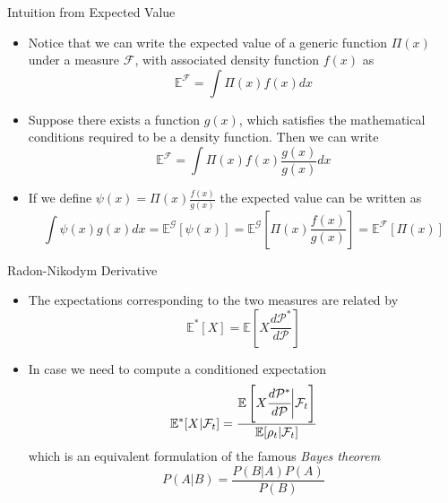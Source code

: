 \documentclass{beamer}
\begin{document}
\begin{frame}{Intuition from Expected Value}
	\begin{itemize}
		\item Notice that we can write the expected value of a generic function $\Pi(x)$ under a measure $\mathcal{F}$, with associated density function $f(x)$ as
		\begin{equation*}
			\mathbb{E}^{\mathcal{F}}=\int\Pi(x)f(x)dx
		\end{equation*}
		\item Suppose there exists a function $g(x)$, which satisfies the mathematical conditions required to be a density function. Then we can write
		\begin{equation*}
			\mathbb{E}^{\mathcal{F}}=\int\Pi(x)f(x)\frac{g(x)}{g(x)}dx
		\end{equation*}
		\item If we define $\psi(x)=\Pi(x)\frac{f(x)}{g(x)}$ the expected value can be written as 
		\begin{equation*}
			\int\psi(x)g(x)dx=\mathbb{E}^{\mathcal{G}}\left[\psi(x)\right]=\mathbb{E}^{\mathcal{G}}\left[\Pi(x)\frac{f(x)}{g(x)}\right]=\mathbb{E}^{\mathcal{F}}\left[\Pi(x)\right]
		\end{equation*}
	\end{itemize}
\end{frame}

\begin{frame}{Radon-Nikodym Derivative}
\begin{itemize}
	\item The expectations corresponding to the two measures are related by
	\begin{equation*}
		\mathbb{E}^*[X] = \mathbb{E}\left[X\frac{d\mathcal{P}^*}{d\mathcal{P}}\right]
	\end{equation*}
	\item In case we need to compute a conditioned expectation
	\begin{equation}
		\mathbb{E}^*[X|\mathcal{F}_t] = \frac{\mathbb{E}\left[X\cfrac{d\mathcal{P}^*}{d\mathcal{P}}\bigg|\mathcal{F}_t\right]}{\mathbb{E}[\rho_t|\mathcal{F}_t]}
		\label{eq:conditioned_expectation}
	\end{equation}
	which is an equivalent formulation of the famous \emph{Bayes theorem}
 	\begin{equation*}
		P(A|B)=\frac{P(B|A)P(A)}{P(B)}
	\end{equation*}
\end{itemize}
\end{frame}
\end{document}

